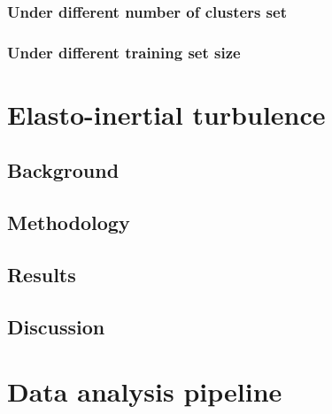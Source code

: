 \documentclass[12pt]{report} %
\begin{document}
\subsection{Under different number of clusters set}

\subsection{Under different training set size}

\chapter{Elasto-inertial turbulence}

\section{Background}

\section{Methodology}

\section{Results}

\section{Discussion}

\chapter{Data analysis pipeline}




\end{document}
